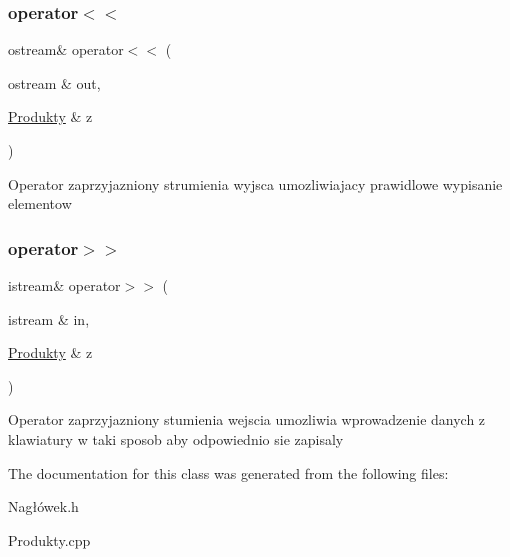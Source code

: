 \subsubsection{\texorpdfstring{operator$<$$<$}{operator<<}}
{\footnotesize\ttfamily ostream\& operator$<$$<$ (\begin{DoxyParamCaption}\item[{ostream \&}]{out,  }\item[{\mbox{\hyperlink{class_produkty}{Produkty}} \&}]{z }\end{DoxyParamCaption})\hspace{0.3cm}{\ttfamily [friend]}}

Operator zaprzyjazniony strumienia wyjsca umozliwiajacy prawidlowe wypisanie elementow \mbox{\label{class_produkty_a66e8098f742269822c07dd1641d419fe}} 
\subsubsection{\texorpdfstring{operator$>$$>$}{operator>>}}
{\footnotesize\ttfamily istream\& operator$>$$>$ (\begin{DoxyParamCaption}\item[{istream \&}]{in,  }\item[{\mbox{\hyperlink{class_produkty}{Produkty}} \&}]{z }\end{DoxyParamCaption})\hspace{0.3cm}{\ttfamily [friend]}}

Operator zaprzyjazniony stumienia wejscia umozliwia wprowadzenie danych z klawiatury w taki sposob aby odpowiednio sie zapisaly 

The documentation for this class was generated from the following files\+:\begin{DoxyCompactItemize}
\item 
Nagłówek.\+h\item 
Produkty.\+cpp\end{DoxyCompactItemize}
